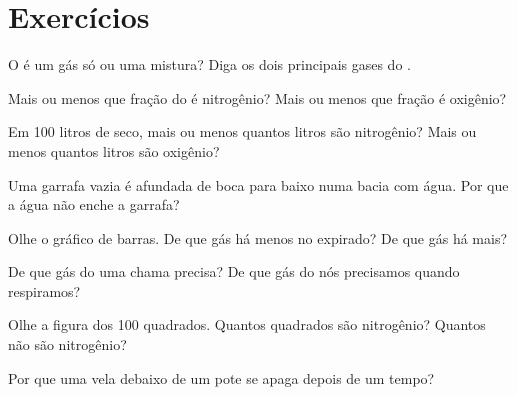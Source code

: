 \section{Exercícios}

\begin{exercise}[$\star$]\label{exo:g4:air-a-mixture-of-gases:1}
O  é um gás só ou uma mistura? Diga os dois principais gases do .
\end{exercise}

\begin{exercise}[$\star$]\label{exo:g4:air-a-mixture-of-gases:2}
Mais ou menos que fração do  é nitrogênio? Mais ou menos que fração
é oxigênio?
\end{exercise}

\begin{exercise}[$\star$]\label{exo:g4:air-a-mixture-of-gases:3}
Em 100 litros de  seco, mais ou menos quantos litros são nitrogênio?
Mais ou menos quantos litros são oxigênio?
\end{exercise}

\begin{exercise}[$\star$]\label{exo:g4:air-a-mixture-of-gases:4}
Uma garrafa vazia é afundada de boca para baixo numa bacia com água.
Por que a água não enche a garrafa?
\end{exercise}

\begin{exercise}[$\star$]\label{exo:g4:air-a-mixture-of-gases:5}
Olhe o gráfico de barras. De que gás há menos no  expirado? De que gás
há mais?
\end{exercise}

\begin{exercise}[$\star$]\label{exo:g4:air-a-mixture-of-gases:6}
De que gás do  uma chama precisa? De que gás do  nós precisamos
quando respiramos?
\end{exercise}

\begin{exercise}[$\star$]\label{exo:g4:air-a-mixture-of-gases:7}
Olhe a figura dos 100 quadrados. Quantos quadrados são nitrogênio?
Quantos não são nitrogênio?
\end{exercise}

\begin{exercise}[$\star$]\label{exo:g4:air-a-mixture-of-gases:8}
Por que uma vela debaixo de um pote se apaga depois de um tempo?
\end{exercise}

